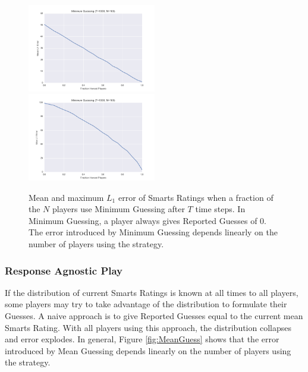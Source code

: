 \begin{figure}[h]
\centerline{%
\includegraphics[width=0.5\textwidth]{figures/robustness/Minimum_Guessing31.png}%
\includegraphics[width=0.5\textwidth] {figures/robustness/Minimum_Guessing32.png}%
}%
\caption{Mean and maximum $L_1$ error of Smarts Ratings when a fraction of the $N$ players use Minimum Guessing after $T$ time steps. In Minimum Guessing, a player always gives Reported Guesses of $0$. The error introduced by Minimum Guessing depends linearly on the number of players using the strategy.}
\label{fig:MinimumGuess}
\end{figure}

\subsubsection{Response Agnostic Play}

If the distribution of current Smarts Ratings is known at all times to all players, some players may try to take advantage of the distribution to formulate their Guesses. A naive approach is to give Reported Guesses equal to the current mean Smarts Rating. With all players using this approach, the distribution collapses and error explodes. In general, Figure \ref{fig:MeanGuess} shows that the error introduced by Mean Guessing depends linearly on the number of players using the strategy.

